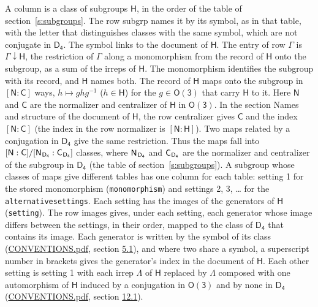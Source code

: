 \documentclass[10pt,a4paper]{article}
\numberwithin{equation}{section}
\newcommand{\grp}[1]{\mathsf{#1}}
\newcommand{\grpindex}[2]{[#1 : #2]}
\newcommand{\restr}[2]{#1\!\downarrow#2}
\newcommand{\hairsp}{\mkern1mu}
\begin{document}
A column is a class of subgroups $\grp{H}$, in the order of the table of section~\ref{s:subgroups}. The row subgrp names it by its symbol, as in that table, with the letter that distinguishes classes with the same symbol, which are not conjugate in $\grp{D_{4}}$. The symbol links to the document of $\grp{H}$. The entry of row $\Gamma$ is $\restr{\Gamma}{\grp{H}}$, the restriction of $\Gamma$ along a monomorphism from the record of $\grp{H}$ onto the subgroup, as a sum of the irreps of $\grp{H}$. The monomorphism identifies the subgroup with its record, and $\grp{H}$ names both. \label{n:group.normalizer.o3}\label{n:group.centralizer.o3}The record of $\grp{H}$ maps onto the subgroup in $\grpindex{\grp{N}}{\grp{C}}$ ways, $h \mapsto g h g^{-1}$ ($h \in \grp{H}$) for the $g \in \grp{O(3)}$ that carry $\grp{H}$ to it. Here $\grp{N}$ and $\grp{C}$ are the normalizer and centralizer of $\grp{H}$ in \href{O3.pdf}{$\grp{O(3)}$}. In the section Names and structure of the document of $\grp{H}$, the row centralizer gives $\grp{C}$ and the index $\grpindex{\grp{N}}{\grp{C}}$ (the index in the row normalizer is $\grpindex{\grp{N}}{\grp{H}}$). Two maps related by a conjugation in $\grp{D_{4}}$ give the same restriction. Thus the maps fall into $\grpindex{\grp{N}}{\grp{C}}/\grpindex{\grp{N}_{\hairsp \grp{D_{4}}}}{\grp{C}_{\hairsp \grp{D_{4}}}}$ classes, where $\grp{N}_{\hairsp \grp{D_{4}}}$ and $\grp{C}_{\hairsp \grp{D_{4}}}$ are the normalizer and centralizer of the subgroup in $\grp{D_{4}}$ (the table of section~\ref{s:subgroups}). \label{n:head.setting}A subgroup whose classes of maps give different tables has one column for each table: setting 1 for the stored monomorphism (\texttt{monomorphism}) and settings 2, 3, \dots{} for the \texttt{alternativesettings}. Each setting has the images of the generators of $\grp{H}$ (\texttt{setting}). \label{n:head.images}The row images gives, under each setting, each generator whose image differs between the settings, in their order, mapped to the class of $\grp{D_{4}}$ that contains its image. \label{n:element.generator.index}Each generator is written by the symbol of its class (\href{../../CONVENTIONS.pdf}{CONVENTIONS.pdf}, section \href{../../CONVENTIONS.pdf\#conv.5.1}{5.1}), and where two share a symbol, a superscript number in brackets gives the generator's index in the document of $\grp{H}$. \label{n:irrep.Delta}Each other setting is setting 1 with each irrep $\Lambda$ of $\grp{H}$ replaced by $\Lambda$ composed with one automorphism of $\grp{H}$ induced by a conjugation in \href{O3.pdf}{$\grp{O(3)}$} and by none in $\grp{D_{4}}$ (\href{../../CONVENTIONS.pdf}{CONVENTIONS.pdf}, section \href{../../CONVENTIONS.pdf\#conv.12.1}{12.1}).
\end{document}
